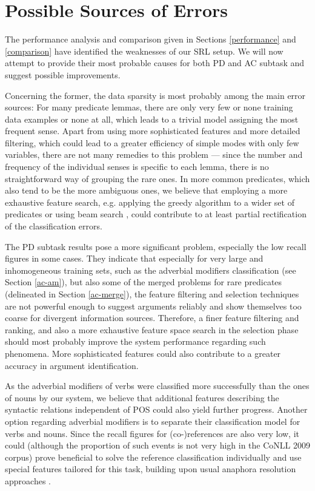\documentclass[12pt,notitlepage]{report}
\begin{document}
\section{Possible Sources of Errors}\label{error-sources}

The performance analysis and comparison given in Sections \ref{performance} and \ref{comparison} have identified the weaknesses of our SRL setup. We will now attempt to provide their most probable causes for both PD and AC subtask and suggest possible improvements.

Concerning the former, the data sparsity is most probably among the main error sources: For many predicate lemmas, there are only very few or none training data examples or none at all, which leads to a trivial model assigning the most frequent sense. Apart from using more sophisticated features and more detailed filtering, which could lead to a greater efficiency of simple modes with only few variables, there are not many remedies to this problem --- since the number and frequency of the individual senses is specific to each lemma, there is no straightforward way of grouping the rare ones. In more common predicates, which also tend to be the more ambiguous ones, we believe that employing a more exhaustive feature search, e.g. applying the greedy algorithm to a wider set of predicates or using beam search \citep{aha95}, could contribute to at least partial rectification of the classification errors.
 
The PD subtask results pose a more significant problem, especially the low recall figures in some cases. They indicate that especially for very large and inhomogeneous training sets, such as the adverbial modifiers classification (see Section \ref{ac-am}), but also some of the merged problems for rare predicates (delineated in Section \ref{ac-merge}), the feature filtering and selection techniques are not powerful enough to suggest arguments reliably and show themselves too coarse for divergent information sources. Therefore, a finer feature filtering and ranking, and also a more exhaustive feature space search in the selection phase should most probably improve the system performance regarding such phenomena. More sophisticated features could also contribute to a greater accuracy in argument identification.

As the adverbial modifiers of verbs were classified more successfully than the ones of nouns by our system, we believe that additional features describing the syntactic relations independent of POS could also yield further progress. Another option regarding adverbial modifiers is to separate their classification model for verbs and nouns. Since the recall figures for (co-)references are also very low, it could (although the proportion of such events is not very high in the CoNLL 2009 corpus) prove beneficial to solve the reference classification individually and use special features tailored for this task, building upon usual anaphora resolution approaches \citep{soon01,ng02}.
\end{document}
